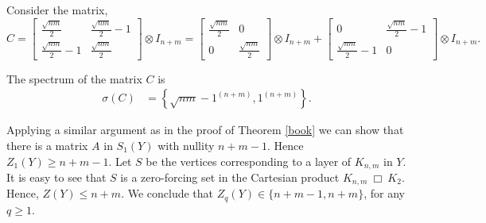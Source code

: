 \documentclass[3p,times,12pt]{article}
\newcommand{\sqr}{\: \Box\:  }
\begin{document}
	Consider the matrix, 
	$$C = \begin{bmatrix}
	\frac{\sqrt{nm}}{2} & \frac{\sqrt{nm}}{2}-1\\
	\frac{\sqrt{nm}}{2}-1 & \frac{\sqrt{nm}}{2}
	\end{bmatrix} \otimes I_{n+m} = \begin{bmatrix}
	\frac{\sqrt{nm}}{2} & 0\\
	0 & \frac{\sqrt{nm}}{2}
	\end{bmatrix} \otimes I_{n+m} + \begin{bmatrix}
	0 & \frac{\sqrt{nm}}{2}-1\\
	\frac{\sqrt{nm}}{2}-1 & 0
	\end{bmatrix} \otimes I_{n+m}.$$ 
	
	The spectrum of the matrix $C$ is
	\begin{align*}
	\sigma(C) &= \left\{ \sqrt{nm}-1^{(n+m)},1^{(n+m)} \right\}.
	\end{align*}
	
	Applying a similar argument as in the proof of Theorem \ref{book} we can show that there is a matrix $A$ in $S_1(Y)$ with nullity $n+m-1$. Hence  $Z_1(Y) \geq n+m-1$. 
	Let $S$ be the vertices corresponding to a layer of $K_{n,m}$ in $Y$. It is easy to see that $S$ is a zero-forcing set in the Cartesian product $K_{n,m} \sqr K_2$. Hence, $Z(Y) \leq n+m$. We conclude that $Z_q(Y) \in \{n+m-1,n+m\}$, for any $q\geq 1$.
	
%		
%	
	
\end{document}
